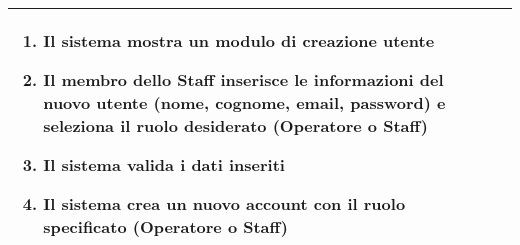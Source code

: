 \documentclass[a4paper]{report}
\begin{document}
\begin{table}[H]
\begin{tabular}{|p{3.9cm}|p{9.9cm}|}
\begin{enumerate}[leftmargin=14pt,label=\arabic*.,labelsep=0.5em,topsep=0pt,partopsep=0pt,parsep=0pt,itemsep=0pt]
    \begin{enumerate}[label=\arabic{enumi}.\arabic*.,leftmargin=22pt,labelsep=0.5em,topsep=0pt,partopsep=0pt,parsep=0pt,itemsep=0pt]
        \item Il sistema mostra un modulo di creazione utente
        \item Il membro dello Staff inserisce le informazioni del nuovo utente (nome, cognome, email, password) e seleziona il ruolo desiderato (Operatore o Staff)
        \item Il sistema valida i dati inseriti
        \item Il sistema crea un nuovo account con il ruolo specificato (Operatore o Staff)
    \end{enumerate}
\end{enumerate}\\ \hline
\end{tabular}
\end{table}
\end{document}
